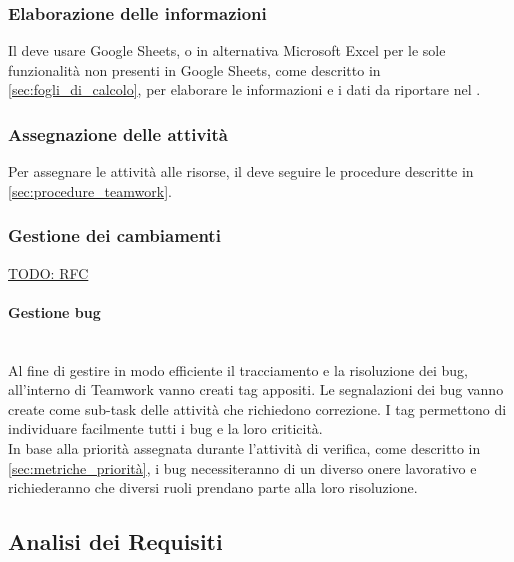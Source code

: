 \subsubsection{Elaborazione delle informazioni}
Il \Responsabile\space deve usare Google Sheets, o in alternativa Microsoft Excel per le sole funzionalità non presenti in Google Sheets, come descritto in \sezione\ref{sec:fogli_di_calcolo}, per elaborare le informazioni e i dati da riportare nel \PianoDiProgetto.

\subsubsection{Assegnazione delle attività}
Per assegnare le attività alle risorse, il \Responsabile deve seguire le procedure descritte in \sezione\ref{sec:procedure_teamwork}.

\subsubsection{Gestione dei cambiamenti}
\underline{TODO: RFC}

\paragraph{Gestione bug} \mbox{} \\
Al fine di gestire in modo efficiente il tracciamento e la risoluzione dei bug, all'interno di Teamwork vanno creati tag appositi.
Le segnalazioni dei bug vanno create come sub-task delle attività che richiedono correzione. I tag permettono di individuare facilmente tutti i bug e la loro criticità. \\
In base alla priorità assegnata durante l'attività di verifica, come descritto in \PianoDiQualifica\space \sezione\ref{sec:metriche_priorità}, i bug necessiteranno di un diverso onere lavorativo e richiederanno che diversi ruoli prendano parte alla loro risoluzione.

\subsection{Analisi dei Requisiti}

